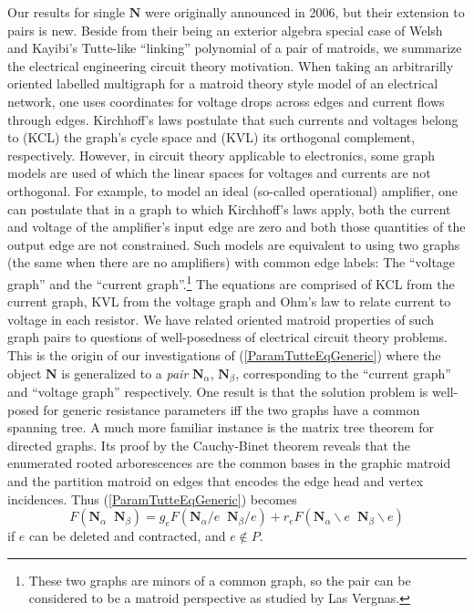 \documentclass[Unicode]{cedram-alco}
\newcommand{\ext}[1]{\ensuremath{\mathbf{#1}}}
\begin{document}
Our results for single $\ext{N}$ were originally announced in 2006\cite{TutteEx}, but
their extension to
pairs is new.  Beside from their being an exterior algebra 
special case of Welsh and Kayibi's Tutte-like ``linking'' polynomial of
a pair of matroids\cite{WelshKayibiLinking},
we summarize the electrical engineering circuit theory motivation.
When taking an arbitrarilly oriented labelled multigraph for
a matroid theory style model of an electrical network, one
uses coordinates
for voltage drops across edges and current flows through
edges.  Kirchhoff's laws postulate that such currents and voltages
belong to (KCL) the graph's cycle space and (KVL) its orthogonal complement, respectively.
However, in circuit theory applicable to electronics\cite{OzawaPrinPartn},
some graph models are used
of which the linear spaces for voltages and currents are not orthogonal.
For example, to model an ideal (so-called operational) amplifier, one
can postulate that in a graph to which Kirchhoff's laws apply,
both the current and voltage of the amplifier's input edge are zero
and both those quantities of the output edge are not constrained.  Such
models are equivalent to using two graphs (the same when there are no amplifiers)
with common edge labels:  The ``voltage graph''
and the ``current graph''.\footnote{
These two graphs are minors of a common graph, so the pair can be considered
to be a matroid perspective as studied by Las Vergnas\cite{SetPointedLV}.}
The equations are comprised of KCL from the current graph, KVL from
the voltage graph and Ohm's law to relate current to voltage in
each resistor.  We have related oriented matroid properties of
such graph pairs to questions of well-posedness of electrical
circuit theory problems\cite{sdcOMP}.  This is the origin of our investigations of
(\ref{ParamTutteEqGeneric})  where the object $\ext{N}$ is generalized
to a \emph{pair} $\ext{N}_\alpha$, $\ext{N}_\beta$, corresponding to the ``current graph''
and ``voltage graph'' respectively.  One result is that the solution problem
is well-posed for generic resistance parameters iff the two graphs have a common
spanning tree.  A much more familiar instance is the matrix tree theorem
for directed graphs. Its proof by the Cauchy-Binet theorem reveals that
the enumerated rooted arborescences are the common bases in the graphic
matroid and the partition matroid on edges that encodes the edge head and vertex
incidences.  Thus (\ref{ParamTutteEqGeneric}) becomes
\begin{equation}\label{ParamTutteEqGenericPairs}
  F(\ext{N}_\alpha\;\;\ext{N}_\beta) =
  g_eF(\ext{N}_{\alpha}/e\;\;\ext{N}{_\beta}/e)+
  r_eF(\ext{N}_{\alpha}\backslash e\;\;\ext{N}_{\beta}\backslash e) 
\end{equation}
if $e$ can be deleted and contracted, and $e\not\in P$.
\end{document}

